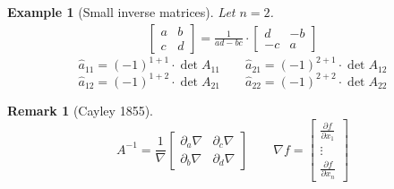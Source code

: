 \documentclass[a4paper]{article}
\newcounter{lecref}[section]
\numberwithin{lecref}{section}
\newtheorem{example}[lecref]{Example}
\newtheorem*{Remark}{Remark}
\begin{document}
\begin{example}[Small inverse matrices] %
  Let $n=2$.
  \begin{align*}
    \begin{bmatrix}
     a & b \\
     c & d
    \end{bmatrix}
    = \frac{1}{ad - bc} \cdot
    \begin{bmatrix} d & -b \\ -c & a \end{bmatrix}
  \end{align*}
  \[ \hat{a}_{11} = (-1)^{1+1} \cdot \det{A_{11}} \qquad \hat{a}_{21} = (-1)^{2+1} \cdot \det{A_{12}} \]
  \[ \hat{a}_{12} = (-1)^{1+2} \cdot \det{A_{21}} \qquad \hat{a}_{22} = (-1)^{2+2} \cdot \det{A_{22}} \]
\end{example}

\begin{Remark}[Cayley 1855]
  \[
    A^{-1} = \frac{1}{\nabla} \begin{bmatrix} \partial_a \nabla & \partial_c \nabla \\ \partial_b \nabla & \partial_d \nabla \end{bmatrix} \qquad
    \nabla f = \begin{bmatrix} \frac{\partial f}{\partial x_1} \\ \vdots \\ \frac{\partial f}{\partial x_n} \end{bmatrix}
  \]
\end{Remark}
\end{document}
